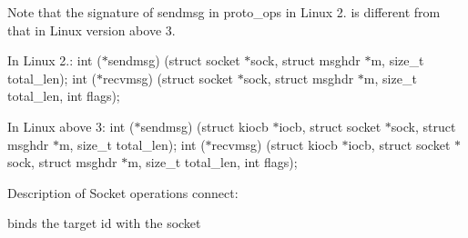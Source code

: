 Note that the signature of sendmsg in proto\+\_\+ops in Linux 2. is different from that in Linux version above 3.

In Linux 2.\+: int ($\ast$sendmsg) (struct socket $\ast$sock, struct msghdr $\ast$m, size\+\_\+t total\+\_\+len); int ($\ast$recvmsg) (struct socket $\ast$sock, struct msghdr $\ast$m, size\+\_\+t total\+\_\+len, int flags);

In Linux above 3\+: int ($\ast$sendmsg) (struct kiocb $\ast$iocb, struct socket $\ast$sock, struct msghdr $\ast$m, size\+\_\+t total\+\_\+len); int ($\ast$recvmsg) (struct kiocb $\ast$iocb, struct socket $\ast$sock, struct msghdr $\ast$m, size\+\_\+t total\+\_\+len, int flags);

Description of Socket operations connect\+:
\begin{DoxyItemize}
\item binds the target id with the socket 
\end{DoxyItemize}